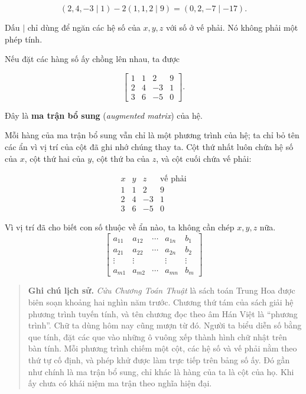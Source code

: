 \documentclass[12pt,a4paper]{article}
\begin{document}
$$ (2,4,-3\mid1)-2(1,1,2\mid9) =(0,2,-7\mid-17). $$

Dấu \(|\) chỉ dùng để ngăn các hệ số của \(x,y,z\) với số ở vế phải. Nó không phải một phép tính.

Nếu đặt các hàng số ấy chồng lên nhau, ta được

$$ \left[ \begin{array}{ccc|c} 1&1&2&9\\ 2&4&-3&1\\ 3&6&-5&0 \end{array} \right]. $$

Đây là \textbf{ma trận bổ sung} (\emph{augmented matrix}) của hệ.

Mỗi hàng của ma trận bổ sung vẫn chỉ là một phương trình của hệ; ta chỉ bỏ tên các ẩn vì vị trí của cột đã ghi nhớ chúng thay ta. Cột thứ nhất luôn chứa hệ số của \(x\), cột thứ hai của \(y\), cột thứ ba của \(z\), và cột cuối chứa vế phải:

$$ \begin{array}{cccc} x & y & z & \text{vế phải}\\ 1 & 1 & 2 & 9\\ 2 & 4 & -3 & 1\\ 3 & 6 & -5 & 0 \end{array} $$

Vì vị trí đã cho biết con số thuộc về ẩn nào, ta không cần chép \(x,y,z\) nữa.
$$
\left[ \begin{array}{cccc|c}
a_{11} & a_{12} & \cdots & a_{1n} & b_1 \\
a_{21} & a_{22} & \cdots & a_{2n} & b_2 \\
\vdots & \vdots & & \vdots & \vdots \\
a_{m1} & a_{m2} & \cdots & a_{mn} & b_m
\end{array} \right]
$$

\begin{quote}
\textbf{Ghi chú lịch sử.} \emph{Cửu Chương Toán Thuật} là sách toán Trung Hoa được biên soạn khoảng hai nghìn năm trước. Chương thứ tám của sách giải hệ phương trình tuyến tính, và tên chương đọc theo âm Hán Việt là ``phương trình''. Chữ ta dùng hôm nay cũng mượn từ đó. Người ta biểu diễn số bằng que tính, đặt các que vào những ô vuông xếp thành hình chữ nhật trên bàn tính. Mỗi phương trình chiếm một cột, các hệ số và vế phải nằm theo thứ tự cố định, và phép khử được làm trực tiếp trên bảng số ấy. Đó gần như chính là ma trận bổ sung, chỉ khác là hàng của ta là cột của họ. Khi ấy chưa có khái niệm ma trận theo nghĩa hiện đại.
\end{quote}
\end{document}
